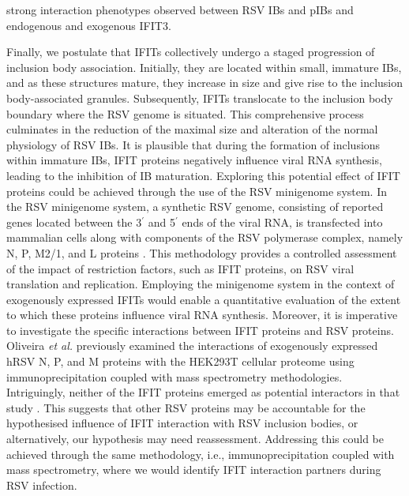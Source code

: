 strong interaction phenotypes observed between RSV IBs and pIBs and endogenous and exogenous IFIT3.

Finally, we postulate that IFITs collectively undergo a staged progression of inclusion body association. Initially, they are located within small, immature IBs, and as these structures mature, they increase in size and give rise to the inclusion body-associated granules. Subsequently, IFITs translocate to the inclusion body boundary where the RSV genome is situated. This comprehensive process culminates in the reduction of the maximal size and alteration of the normal physiology of RSV IBs. It is plausible that during the formation of inclusions within immature IBs, IFIT proteins negatively influence viral RNA synthesis, leading to the inhibition of IB maturation. Exploring this potential effect of IFIT proteins could be achieved through the use of the RSV minigenome system. In the RSV minigenome system, a synthetic RSV genome, consisting of reported genes located between the 3$^{\prime}$ and 5$^{\prime}$ ends of the viral RNA, is transfected into mammalian cells along with components of the RSV polymerase complex, namely N, P, M2/1, and L proteins \cite{Teng2016UseTranscription}. This methodology provides a controlled assessment of the impact of restriction factors, such as IFIT proteins, on RSV viral translation and replication. Employing the minigenome system in the context of exogenously expressed IFITs would enable a quantitative evaluation of the extent to which these proteins influence viral RNA synthesis. Moreover, it is imperative to investigate the specific interactions between IFIT proteins and RSV proteins. Oliveira \textit{et al.} previously examined the interactions of exogenously expressed hRSV N, P, and M proteins with the HEK293T cellular proteome using immunoprecipitation coupled with mass spectrometry methodologies. Intriguingly, neither of the IFIT proteins emerged as potential interactors in that study \cite{Oliveira2013HumanCells}. This suggests that other RSV proteins may be accountable for the hypothesised influence of IFIT interaction with RSV inclusion bodies, or alternatively, our hypothesis may need reassessment. Addressing this could be achieved through the same methodology, i.e., immunoprecipitation coupled with mass spectrometry, where we would identify IFIT interaction partners during RSV infection.

